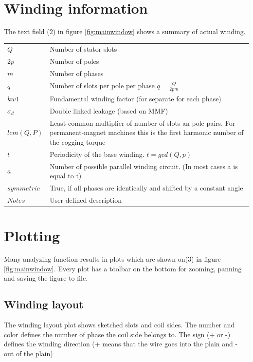 \documentclass[]{scrreprt}
\begin{document}
\section{Winding information}
The text field (2) in figure \ref{fig:mainwindow} shows a summary of actual winding. 
%
\begin{center}
\begin{table}[h]
\begin{tabularx}{\textwidth}{lX}
$Q$ & Number of stator slots \\
$2p$ & Number of poles  \\
$m$ & Number of phases \\
$q$ & Number of slots per pole per phase $q=\frac{Q}{2pm}$ \\
$kw1$ & Fundamental winding factor (for separate for each phase) \\
$\sigma_d$ & Double linked leakage (based on MMF) \\
$lcm(Q,P)$ & Least common multiplier of number of slots an pole pairs. For permanent-magnet machines this is the first harmonic  number of the cogging torque \\
$t$ & Periodicity of the base winding. $t = gcd(Q, p)$ \\
$a$ & Number of possible parallel winding circuit. (In most cases a is equal to t) \\
$symmetric$ & True, if all phases are identically and shifted by a constant angle \\
$Notes$ & User defined description \\
\end{tabularx}
\end{table}
\end{center}


%
%
%
%
\section{Plotting}
Many analyzing function results in plots which are shown on(3) in figure \ref{fig:mainwindow}.
Every plot has a toolbar on the bottom for zooming, panning and saving the figure to file.
%
%
\subsection{Winding layout}
The winding layout plot shows sketched slots and coil sides. The number and color defines the number
of phase the coil side belongs to. The sign (+ or -) defines the winding direction (+ means that the
wire goes into the plain and - out of the plain)
%
%
\end{document}

